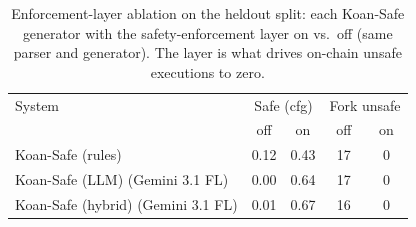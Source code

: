 \begin{table}[t]
\centering
\caption{Enforcement-layer ablation on the heldout split: each Koan-Safe generator with the safety-enforcement layer on vs.\ off (same parser and generator). The layer is what drives on-chain unsafe executions to zero.}
\label{tab:enforcement-ablation}
\begin{tabular}{lcccc}
\toprule
System & \multicolumn{2}{c}{Safe (cfg)} & \multicolumn{2}{c}{Fork unsafe} \\
 & off & on & off & on \\
\midrule
Koan-Safe (rules) & 0.12 & 0.43 & 17 & 0 \\
Koan-Safe (LLM) (Gemini 3.1 FL) & 0.00 & 0.64 & 17 & 0 \\
Koan-Safe (hybrid) (Gemini 3.1 FL) & 0.01 & 0.67 & 16 & 0 \\
\bottomrule
\end{tabular}
\end{table}
